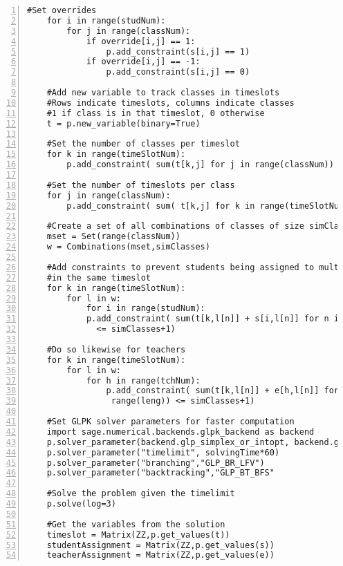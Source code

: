 \documentclass[11pt]{article}
\begin{document}
\begin{lstlisting}[numbers=left,numberstyle=\tiny,numbersep=0pt]
    #Set overrides    
    for i in range(studNum):
        for j in range(classNum):
            if override[i,j] == 1:
                p.add_constraint(s[i,j] == 1)
            if override[i,j] == -1:
                p.add_constraint(s[i,j] == 0)
                
    #Add new variable to track classes in timeslots
    #Rows indicate timeslots, columns indicate classes
    #1 if class is in that timeslot, 0 otherwise            
    t = p.new_variable(binary=True)
    
    #Set the number of classes per timeslot
    for k in range(timeSlotNum):
        p.add_constraint( sum(t[k,j] for j in range(classNum)) == simClasses)
    
    #Set the number of timeslots per class    
    for j in range(classNum):
        p.add_constraint( sum( t[k,j] for k in range(timeSlotNum)) == 1)
    
    #Create a set of all combinations of classes of size simClassess    
    mset = Set(range(classNum))
    w = Combinations(mset,simClasses)
    
    #Add constraints to prevent students being assigned to multiple classes
    #in the same timeslot
    for k in range(timeSlotNum):
        for l in w:
            for i in range(studNum):
            p.add_constraint( sum(t[k,l[n]] + s[i,l[n]] for n in range(leng))
              <= simClasses+1)
              
    #Do so likewise for teachers          
    for k in range(timeSlotNum):
        for l in w:
            for h in range(tchNum):
                p.add_constraint( sum(t[k,l[n]] + e[h,l[n]] for n in 
                 range(leng)) <= simClasses+1)
     
    #Set GLPK solver parameters for faster computation            
    import sage.numerical.backends.glpk_backend as backend
    p.solver_parameter(backend.glp_simplex_or_intopt, backend.glp_intopt_only)
    p.solver_parameter("timelimit", solvingTime*60)
    p.solver_parameter("branching","GLP_BR_LFV")
    p.solver_parameter("backtracking","GLP_BT_BFS"
    
    #Solve the problem given the timelimit
    p.solve(log=3)
    
    #Get the variables from the solution
    timeslot = Matrix(ZZ,p.get_values(t))
    studentAssignment = Matrix(ZZ,p.get_values(s))
    teacherAssignment = Matrix(ZZ,p.get_values(e))
\end{lstlisting}
\end{document}
